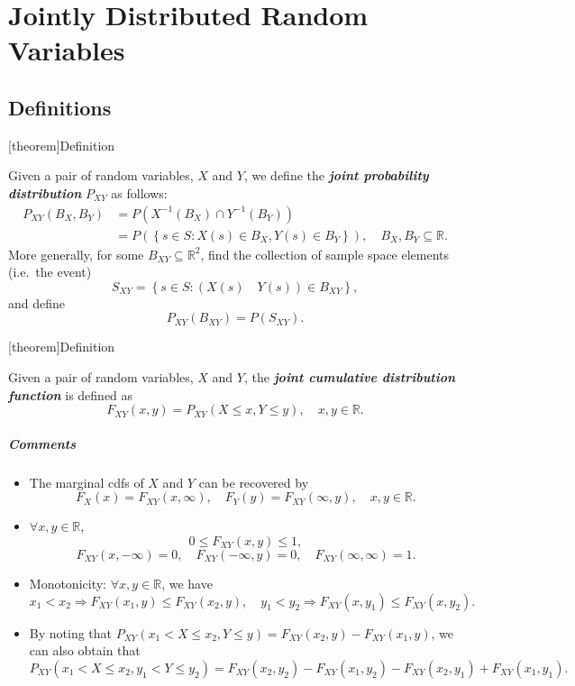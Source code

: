 \documentclass[12pt]{report}
\theoremstyle{definition}
\begin{document}
\chapter{Jointly Distributed Random Variables}

\section{Definitions}

[theorem]{Definition}
\begin{joint probability distribution}
    Given a pair of random variables, $X$ and $Y$, we define the
    \textbf{\emph{joint probability distribution}} $P_{XY}$ as follows:
    \begin{align*}
        P_{XY}(B_X, B_Y)
        & =P\left(X^{-1}(B_X)\cap Y^{-1}(B_Y)\right) \\
        & = P\left(\left\{s\in S:X(s)\in B_X, Y(s)\in B_Y\right\}\right),
        \quad B_X,B_Y\subseteq\mathbb{R}.
    \end{align*} 
    More generally, for some $B_{XY}\subseteq\mathbb{R}^{2}$, find the
    collection of sample space elements (i.e.\ the event)
    \[
        S_{XY}=\left\{s\in S:\left(X(s)\quad Y(s)\right)\in B_{XY}\right\},
    \]
    and define
    \[
        P_{XY}(B_{XY})=P(S_{XY}).
    \]
\end{joint probability distribution}

[theorem]{Definition}
\begin{joint cdf}
    Given a pair of random variables, $X$ and $Y$, the \textbf{\emph{joint
    cumulative distribution function}} is defined as\[
        F_{XY}(x,y)=P_{XY}(X\le x,Y\le y),\quad x,y\in\mathbb{R}.
    \]
\end{joint cdf}
\paragraph{Comments}
\begin{itemize}
    \item The marginal cdfs of $X$ and $Y$ can be recovered by
        \[
            F_X(x)=F_{XY}(x,\infty),\quad
            F_Y(y)=F_{XY}(\infty,y),\quad
            x,y\in\mathbb{R}.
        \]
    \item $\forall x,y\in\mathbb{R}$,
        \[
            0\le F_{XY}(x,y)\le 1,
        \]
        \[
            F_{XY}(x,-\infty)=0,\quad
            F_{XY}(-\infty,y)=0,\quad
            F_{XY}(\infty,\infty)=1.
        \]
    \item Monotonicity: $\forall x,y\in\mathbb{R}$, we have
        \[
            x_1<x_2\Rightarrow F_{XY}(x_1,y)\le F_{XY}(x_2,y),\quad
            y_1<y_2\Rightarrow F_{XY}(x,y_1)\le F_{XY}(x,y_2).
        \]
    \item By noting that $P_{XY}(x_1<X\le x_2, Y\le
        y)=F_{XY}(x_2,y)-F_{XY}(x_1,y)$, we can also obtain that
        \[
            P_{XY}(x_1<X\le x_2,y_1<Y\le y_2)
            =F_{XY}(x_2,y_2)-F_{XY}(x_1,y_2)-F_{XY}(x_2,y_1)+F_{XY}(x_1,y_1).
        \]
\end{itemize} 
\end{document}
